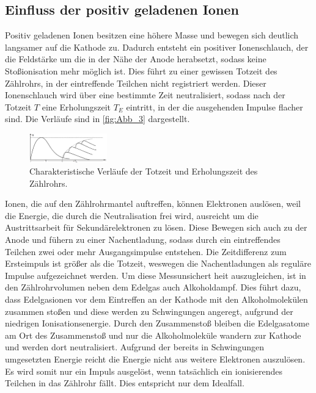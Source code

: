 \subsection{Einfluss der positiv geladenen Ionen}
\label{subsec:Einfluss}
Positiv geladenen Ionen besitzen eine höhere Masse und bewegen sich deutlich 
langsamer auf die Kathode zu. Dadurch entsteht ein positiver Ionenschlauch, der die Feldstärke
um die in der Nähe der Anode herabsetzt, sodass keine Stoßionisation mehr möglich ist. Dies führt 
zu einer gewissen Totzeit des Zählrohrs, in der eintreffende Teilchen nicht registriert werden.
Dieser Ionenschlauch wird über eine bestimmte Zeit neutralisiert, sodass nach der Totzeit $T$
eine Erholungszeit $T_E$ eintritt, in der die ausgehenden Impulse flacher sind. 
Die Verläufe sind in \autoref{fig:Abb_3} dargestellt.
\begin{figure}[H]
    \centering
    \includegraphics[width=0.3\textwidth]{Abbildungen/Abb_3.png}
    \caption{Charakteristische Verläufe der Totzeit und Erholungszeit des Zählrohrs.\cite{V703}}
    \label{fig:Abb_3}
\end{figure}
Ionen, die auf den Zählrohrmantel auftreffen, können Elektronen auslösen, weil die Energie,
die durch die Neutralisation frei wird, ausreicht um die Austrittsarbeit für Sekundärelektronen
zu lösen. Diese Bewegen sich auch zu der Anode und fühern zu einer Nachentladung, sodass durch ein eintreffendes
Teilchen zwei oder mehr Ausgangsimpulse entstehen. Die Zeitdifferenz zum Ersteimpuls ist größer
als die Totzeit, weswegen die Nachentladungen als reguläre Impulse aufgezeichnet werden. 
Um diese Messunsichert heit auszugleichen, ist in den Zählrohrvolumen neben dem Edelgas auch Alkoholdampf.
Dies führt dazu, dass Edelgasionen vor dem Eintreffen an der Kathode mit den Alkoholmolekülen zusammen stoßen
und diese werden zu Schwingungen angeregt, aufgrund der niedrigen Ionisationsenergie.
Durch den Zusammenstoß bleiben die Edelgasatome am Ort des Zusammenstoß und nur die Alkoholmoleküle wandern zur Kathode
und werden dort neutralisiert. Aufgrund der bereits in Schwingungen umgesetzten Energie reicht die Energie nicht aus 
weitere Elektronen auszulösen.
Es wird somit nur ein Impuls ausgelöst, wenn tatsächlich ein ionisierendes Teilchen in das Zählrohr fällt.
Dies entspricht nur dem Idealfall.

